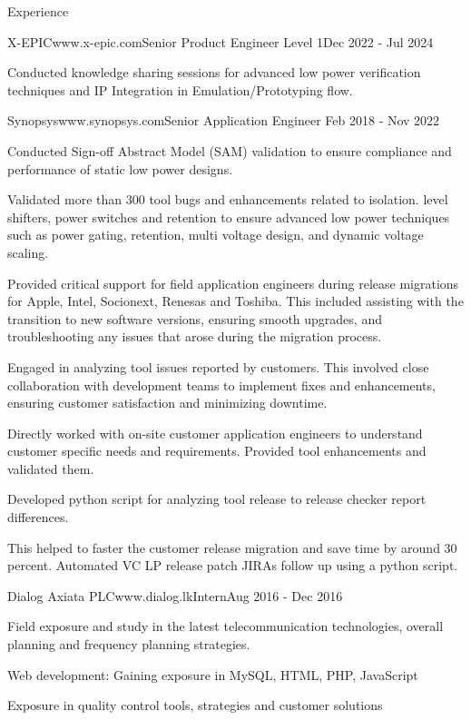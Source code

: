\documentclass[
11pt, %
]{./assets/resume} %
\begin{document}
\begin{rSection}{Experience}
\begin{rSubsectionX}{X-EPIC}{www.x-epic.com}{Senior Product Engineer Level 1}{Dec 2022 - Jul 2024}
		\item Conducted knowledge sharing sessions for advanced low power verification techniques and IP Integration in Emulation/Prototyping flow.
	\end{rSubsectionX}
	\begin{rSubsectionX}{Synopsys}{www.synopsys.com}{Senior Application Engineer }{Feb 2018 - Nov 2022}
		\item Conducted Sign-off Abstract Model (SAM) validation to ensure compliance and performance of static low power designs.
		\item Validated more than 300 tool bugs and enhancements related to isolation. level shifters, power switches and retention to ensure advanced low power techniques such as power gating, retention, multi voltage design, and dynamic voltage scaling. 
		\item Provided critical support for field application engineers during release migrations for Apple, Intel, Socionext, Renesas and Toshiba. This included assisting with the transition to new software versions, ensuring smooth upgrades, and troubleshooting any issues that arose during the migration process. 
		\item Engaged in analyzing tool issues reported by customers. This involved close collaboration with development teams to implement fixes and enhancements, ensuring customer satisfaction and minimizing downtime. 
		\item Directly worked with on-site customer application engineers to understand customer specific needs and requirements. Provided tool enhancements and validated them. 
		\item Developed python script for analyzing tool release to release checker report differences. 
		\item This helped to faster the customer release migration and save time by around 30 percent. Automated VC LP release patch JIRAs follow up using a python script.
	\end{rSubsectionX}
	\begin{rSubsectionX}{Dialog Axiata PLC}{www.dialog.lk}{Intern}{Aug 2016 - Dec 2016}
		\item Field exposure and study in the latest telecommunication technologies, overall planning and frequency planning strategies.
		\item Web development: Gaining exposure in MySQL, HTML, PHP, JavaScript
		\item Exposure in quality control tools, strategies and customer solutions
	\end{rSubsectionX}
	
\end{rSection}
\end{document}
